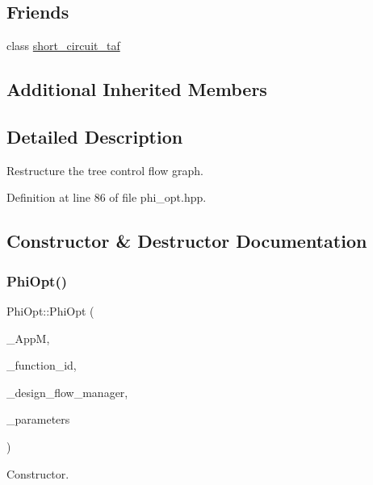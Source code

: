 \subsection*{Friends}
\begin{DoxyCompactItemize}
\item 
class \hyperlink{classPhiOpt_abefe683fd46c528422c3d2bf0fc546d4}{short\+\_\+circuit\+\_\+taf}
\end{DoxyCompactItemize}
\subsection*{Additional Inherited Members}


\subsection{Detailed Description}
Restructure the tree control flow graph. 

Definition at line 86 of file phi\+\_\+opt.\+hpp.



\subsection{Constructor \& Destructor Documentation}
\mbox{\label{classPhiOpt_aacf9802f665e61f3de0790b306667c2b}} 
\subsubsection{\texorpdfstring{Phi\+Opt()}{PhiOpt()}}
{\footnotesize\ttfamily Phi\+Opt\+::\+Phi\+Opt (\begin{DoxyParamCaption}\item[{const \hyperlink{application__manager_8hpp_a04ccad4e5ee401e8934306672082c180}{application\+\_\+manager\+Ref}}]{\+\_\+\+AppM,  }\item[{unsigned int}]{\+\_\+function\+\_\+id,  }\item[{const Design\+Flow\+Manager\+Const\+Ref}]{\+\_\+design\+\_\+flow\+\_\+manager,  }\item[{const \hyperlink{Parameter_8hpp_a37841774a6fcb479b597fdf8955eb4ea}{Parameter\+Const\+Ref}}]{\+\_\+parameters }\end{DoxyParamCaption})}



Constructor. 

